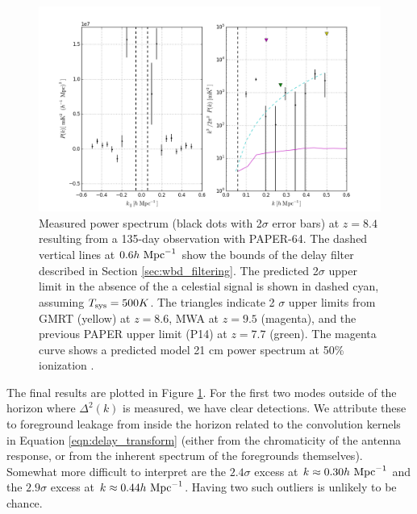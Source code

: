 \documentclass[twocolumn,numberedappendix]{emulateapj} \shorttitle{New Limits on the 21 cm Power Spectrum at $z=8.4$}
\newcommand{\hMpci}{h\ {\rm Mpc}^{-1}}
\newcommand{\Tsys}{T_{\rm sys}}
\begin{document}
\begin{figure}\centering
\includegraphics[width=2\columnwidth]{plots/pk_k3pk.png}
\caption{
Measured power spectrum (black dots with 2$\sigma$ error bars) at $z=8.4$
resulting from a 135-day observation with PAPER-64.  The dashed vertical lines
at $0.6\hMpci$ show the bounds of the delay filter described in Section
\ref{sec:wbd_filtering}. The predicted 2$\sigma$ upper limit in the absence of the a celestial signal is shown in dashed cyan, assuming $\Tsys=500K$. The triangles indicate 2
$\sigma$ upper limits from GMRT \citep{paciga_et_al2011} (yellow) at $z=8.6$,
MWA \citep{dillon_et_al2013b} at $z=9.5$ (magenta), and the previous PAPER upper
limit (P14) at $z=7.7$ (green). The magenta curve shows a predicted model 21 cm power
spectrum at 50\% ionization \citep{lidz_et_al2008}.
} \label{fig:final_pspec}
\end{figure}

The final results are plotted in Figure \ref{fig:final_pspec}.
For the first two modes outside of the horizon where $\Delta^2(k)$ is measured, we have
clear detections. We attribute these to foreground leakage from
inside the horizon related to the convolution kernels in Equation \eqref{eqn:delay_transform} (either
from the chromaticity of the antenna response, or from the inherent spectrum of the
foregrounds themselves).  Somewhat more difficult to interpret are the 
$2.4\sigma$ excess at $k\approx0.30\hMpci$ and 
the $2.9\sigma$ excess at $k\approx0.44\hMpci$. Having two such outliers is
unlikely to be chance.
\end{document}
